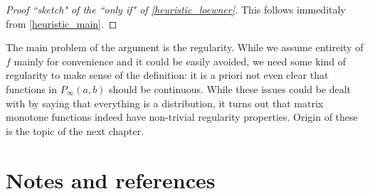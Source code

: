 \begin{proof}[Proof ``sketch" of the ``only if" of \ref{heuristic_loewner}]
	This follows immeditaly from \ref{heuristic_main}.
\end{proof}

The main problem of the argument is the regularity. While we assume entireity of $f$ mainly for convenience and it could be easily avoided, we need some kind of regularity to make sense of the definition: it is a priori not even clear that functions in $P_{\infty}(a, b)$ should be continuous. While these issues could be dealt with by saying that everything is a distribution, it turns out that matrix monotone functions indeed have non-trivial regularity properties. Origin of these is the topic of the next chapter.


\section{Notes and references}
